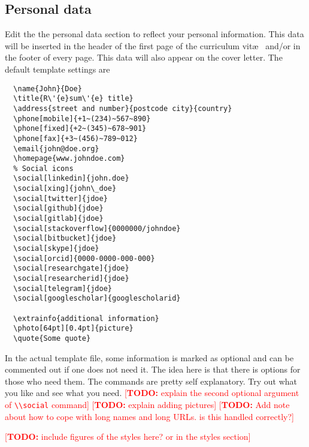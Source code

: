 \documentclass[a4paper,11pt]{article}
\newcommand{\todox}[1]{\textcolor{red}{[\textbf{TODO:} #1]}}
\newcommand{\code}[1]{\lstinline!#1!}
\begin{document}
\subsection{Personal data}
Edit the the personal data section to reflect your personal information. This data will be inserted in the header of the first page of the curriculum vit\ae~ and/or in the footer of every page. 
This data will also appear on the cover letter. 
The default template settings are

\begin{lstlisting}
  \name{John}{Doe}
  \title{R\'{e}sum\'{e} title}
  \address{street and number}{postcode city}{country}
  \phone[mobile]{+1~(234)~567~890}
  \phone[fixed]{+2~(345)~678~901}
  \phone[fax]{+3~(456)~789~012}
  \email{john@doe.org}
  \homepage{www.johndoe.com}
  % Social icons
  \social[linkedin]{john.doe}
  \social[xing]{john\_doe}               
  \social[twitter]{jdoe}                 
  \social[github]{jdoe}                  
  \social[gitlab]{jdoe}                  
  \social[stackoverflow]{0000000/johndoe}
  \social[bitbucket]{jdoe}               
  \social[skype]{jdoe}                   
  \social[orcid]{0000-0000-000-000}      
  \social[researchgate]{jdoe}            
  \social[researcherid]{jdoe}            
  \social[telegram]{jdoe}                
  \social[googlescholar]{googlescholarid}    

  \extrainfo{additional information}     
  \photo[64pt][0.4pt]{picture}
  \quote{Some quote}                     
\end{lstlisting}
In the actual template file, some information is marked as optional and can be commented out if one does not need it. 
The idea here is that there is options for those who need them. 
The commands are pretty self explanatory. Try out what you like and see what you need.
\todox{explain the second optional argument of \code{\\social} command}
\todox{explain adding pictures}
\todox{Add note about how to cope with long names and long URLs. is this handled correctly?}

\todox{include figures of the styles here? or in the styles section}
\end{document}
